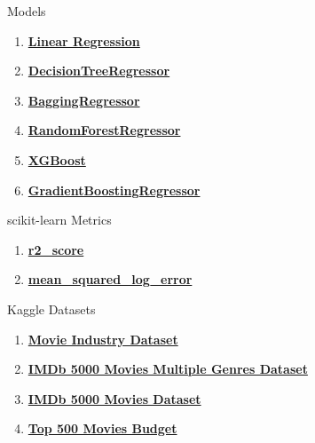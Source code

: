 \documentclass[conference]{IEEEtran}
\begin{document}
\begin{thebibliography}{1}
     Models
    \begin{enumerate}
        \item \href{https://scikit-learn.org/stable/modules/generated/sklearn.linear_model.LinearRegression.html}{\textbf{Linear Regression}}
        \item \href{https://scikit-learn.org/stable/modules/generated/sklearn.tree.DecisionTreeRegressor.html}{\textbf{DecisionTreeRegressor}}
        \item \href{https://scikit-learn.org/stable/modules/generated/sklearn.ensemble.BaggingRegressor.html}{\textbf{BaggingRegressor}}
        \item \href{https://scikit-learn.org/stable/modules/generated/sklearn.ensemble.RandomForestRegressor.html}{\textbf{RandomForestRegressor}}
        \item \href{https://xgboost.readthedocs.io/}{\textbf{XGBoost}}
        \item \href{https://scikit-learn.org/stable/modules/generated/sklearn.ensemble.GradientBoostingRegressor.html}{\textbf{GradientBoostingRegressor}}
    \end{enumerate}

     scikit-learn Metrics
    \begin{enumerate}
        \item \href{https://scikit-learn.org/stable/modules/generated/sklearn.metrics.r2_score.html}{\textbf{r2\_score}}
        \item \href{https://scikit-learn.org/stable/modules/generated/sklearn.metrics.mean_squared_log_error.html}{\textbf{mean\_squared\_log\_error}}
    \end{enumerate}

     Kaggle Datasets
    \begin{enumerate}
        \item \href{https://www.kaggle.com/datasets/danielgrijalvas/movies}{\textbf{Movie Industry Dataset}}
        \item \href{https://www.kaggle.com/datasets/rakkesharv/imdb-5000-movies-multiple-genres-dataset}{\textbf{IMDb 5000 Movies Multiple Genres Dataset}}
        \item \href{https://www.kaggle.com/datasets/carolzhangdc/imdb-5000-movie-dataset}{\textbf{IMDb 5000 Movies Dataset}}
        \item \href{https://www.kaggle.com/datasets/mitchellharrison/top-500-movies-budget}{\textbf{Top 500 Movies Budget}}
    \end{enumerate}
\end{thebibliography}
\end{document}
